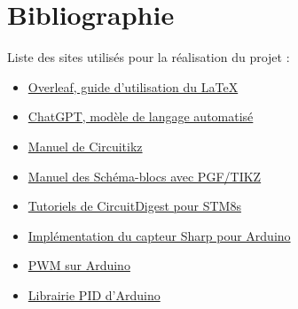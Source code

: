 \documentclass[11pt,a4paper]{article}
\begin{document}
\pagebreak
\section{Bibliographie}
Liste des sites utilisés pour la réalisation du projet :
\begin{itemize}
\item \href{https://www.overleaf.com/learn}{Overleaf, guide d'utilisation du \LaTeX{}}
\item \href{https://chat.openai.com/chat}{ChatGPT, modèle de langage automatisé}
\item \href{https://ctan.mines-albi.fr/graphics/pgf/contrib/circuitikz/doc/circuitikzmanual.pdf}{Manuel de Circuitikz}
\item \href{https://sciences-indus-cpge.papanicola.info/IMG/pdf/schemabloc.pdf}{Manuel des Schéma-blocs avec PGF/TIKZ}
\item \href{https://circuitdigest.com/microcontroller-projects/getting-started-with-stm8s-using-stvd-and-cosmic-c-compiler}{Tutoriels de CircuitDigest pour STM8s}
\item \href{https://www.instructables.com/How-to-Use-the-Sharp-IR-Sensor-GP2Y0A41SK0F-Arduin/}{Implémentation du capteur Sharp pour Arduino}
\item \href{https://passionelectronique.fr/pwm-arduino/}{PWM sur Arduino}
\item \href{https://playground.arduino.cc/Code/PIDLibrary/}{Librairie PID d'Arduino}
\end{itemize}
\end{document}
